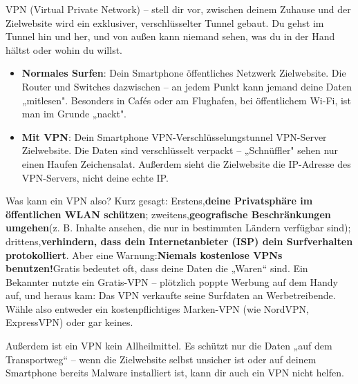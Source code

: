 


VPN (Virtual Private Network) – stell dir vor, zwischen deinem Zuhause und der Zielwebsite wird ein exklusiver, verschlüsselter Tunnel gebaut. Du gehst im Tunnel hin und her, und von außen kann niemand sehen, was du in der Hand hältst oder wohin du willst.

\begin{itemize}
  \item \textbf{Normales Surfen}: Dein Smartphone öffentliches Netzwerk Zielwebsite. Die Router und Switches dazwischen – an jedem Punkt kann jemand deine Daten „mitlesen". Besonders in Cafés oder am Flughafen, bei öffentlichem Wi-Fi, ist man im Grunde „nackt".
  \item \textbf{Mit VPN}: Dein Smartphone VPN-Verschlüsselungstunnel VPN-Server Zielwebsite. Die Daten sind verschlüsselt verpackt – „Schnüffler" sehen nur einen Haufen Zeichensalat. Außerdem sieht die Zielwebsite die IP-Adresse des VPN-Servers, nicht deine echte IP.
\end{itemize}

Was kann ein VPN also? Kurz gesagt: Erstens,\textbf{deine Privatsphäre im öffentlichen WLAN schützen}; zweitens,\textbf{geografische Beschränkungen umgehen}(z. B. Inhalte ansehen, die nur in bestimmten Ländern verfügbar sind); drittens,\textbf{verhindern, dass dein Internetanbieter (ISP) dein Surfverhalten protokolliert}. Aber eine Warnung:\textbf{Niemals kostenlose VPNs benutzen!}Gratis bedeutet oft, dass deine Daten die „Waren“ sind. Ein Bekannter nutzte ein Gratis-VPN – plötzlich poppte Werbung auf dem Handy auf, und heraus kam: Das VPN verkaufte seine Surfdaten an Werbetreibende. Wähle also entweder ein kostenpflichtiges Marken-VPN (wie NordVPN, ExpressVPN) oder gar keines.

Außerdem ist ein VPN kein Allheilmittel. Es schützt nur die Daten „auf dem Transportweg“ – wenn die Zielwebsite selbst unsicher ist oder auf deinem Smartphone bereits Malware installiert ist, kann dir auch ein VPN nicht helfen.

